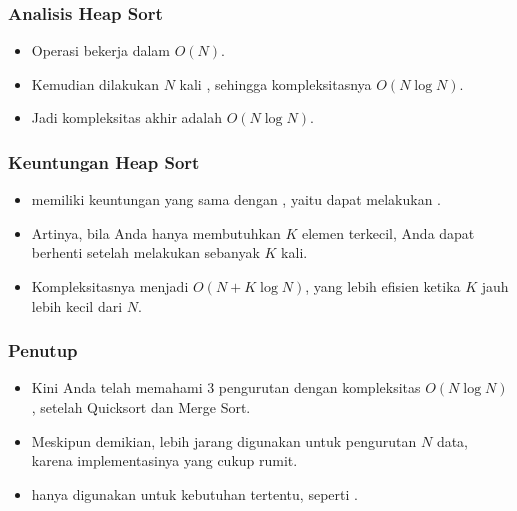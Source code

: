 \begin{frame}
\frametitle{Analisis Heap Sort}
\begin{itemize}
  \item Operasi  bekerja dalam $O(N)$.
  \item Kemudian dilakukan $N$ kali , sehingga kompleksitasnya $O(N\log{N})$.
  \item Jadi kompleksitas akhir \pHeapSort adalah $O(N\log{N})$.
\end{itemize}
\end{frame}

\begin{frame}
\frametitle{Keuntungan Heap Sort}
\begin{itemize}
  \item \pHeapSort memiliki keuntungan yang sama dengan , yaitu dapat melakukan .
  \item Artinya, bila Anda hanya membutuhkan $K$ elemen terkecil, Anda dapat berhenti setelah melakukan  sebanyak $K$ kali.
  \item Kompleksitasnya menjadi $O(N + K \log{N})$, yang lebih efisien ketika $K$ jauh lebih kecil dari $N$.
\end{itemize}
\end{frame}

\begin{frame}
\frametitle{Penutup}
\begin{itemize}
  \item Kini Anda telah memahami 3 pengurutan dengan kompleksitas $O(N \log{N})$, setelah Quicksort dan Merge Sort.
  \item Meskipun demikian, \pHeapSort lebih jarang digunakan untuk pengurutan $N$ data, karena implementasinya yang cukup rumit.
  \item \pHeapSort hanya digunakan untuk kebutuhan tertentu, seperti .
\end{itemize}
\end{frame}




